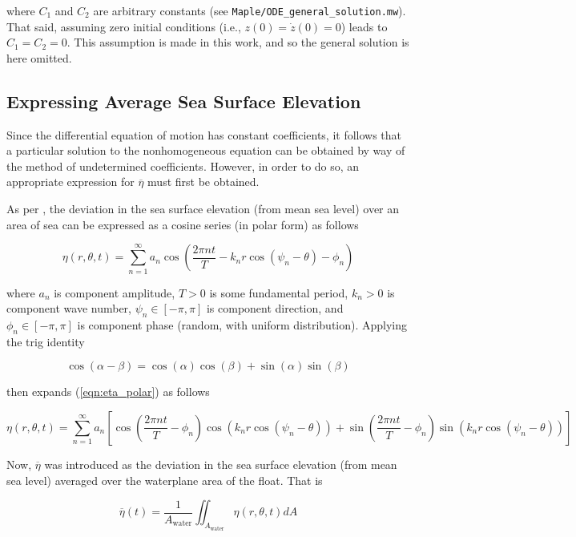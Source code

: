 \noindent where $C_1$ and $C_2$ are arbitrary constants (see \texttt{Maple/ODE\_general\_solution.mw}). That said, assuming zero initial conditions (i.e., $z(0) = \dot{z}(0) = 0$) leads to $C_1 = C_2 = 0$. This assumption is made in this work, and so the general solution is here omitted.

\subsection{Expressing Average Sea Surface Elevation}

Since the differential equation of motion has constant coefficients, it follows that a particular solution to the nonhomogeneous equation can be obtained by way of the method of undetermined coefficients. However, in order to do so, an appropriate expression for $\overline{\eta}$ must first be obtained.\par
As per \cite{Holthuijsen_2010}, the deviation in the sea surface elevation (from mean sea level) over an area of sea can be expressed as a cosine series (in polar form) as follows

\begin{equation}
	\eta(r,\theta,t) = \sum_{n=1}^\infty a_n\cos\left(\frac{2\pi nt}{T} - k_nr\cos(\psi_n - \theta) - \phi_n\right)
	\label{eqn:eta_polar}
\end{equation}

\noindent where $a_n$ is component amplitude, $T>0$ is some fundamental period, $k_n>0$ is component wave number, $\psi_n\in[-\pi,\pi]$ is component direction, and $\phi_n\in[-\pi,\pi]$ is component phase (random, with uniform distribution). Applying the trig identity

$$ \cos(\alpha - \beta) = \cos(\alpha)\cos(\beta) + \sin(\alpha)\sin(\beta) $$

\noindent then expands (\ref{eqn:eta_polar}) as follows

\begin{equation}
	\eta(r,\theta,t) = \sum_{n=1}^\infty a_n\left[\cos\left(\frac{2\pi nt}{T} - \phi_n\right)\cos(k_nr\cos(\psi_n - \theta)) + \sin\left(\frac{2\pi nt}{T} - \phi_n\right)\sin(k_nr\cos(\psi_n - \theta))\right]
	\label{eqn:eta_polar_expanded}
\end{equation}

Now, $\overline{\eta}$ was introduced as the deviation in the sea surface elevation (from mean sea level) averaged over the waterplane area of the float. That is

\begin{equation}
	\overline{\eta}(t) = \frac{1}{A_\textrm{water}}\iint_{A_\textrm{water}}\eta(r,\theta,t)dA
	\label{eqn:eta_overline_integral}
\end{equation}

